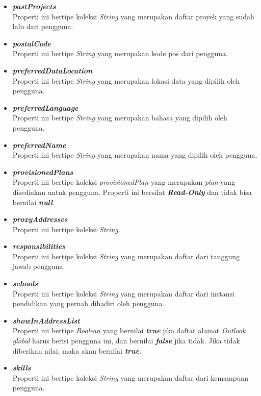 \begin{itemize}
	\item \textbf{\textit{pastProjects}}\\
	Properti ini bertipe koleksi \textit{String} yang merupakan daftar proyek yang sudah lalu dari pengguna.
	\item \textbf{\textit{postalCode}}\\
	Properti ini bertipe \textit{String} yang merupakan kode pos dari pengguna.
	\item \textbf{\textit{preferredDataLocation}}\\
	Properti ini bertipe \textit{String} yang merupakan lokasi data yang dipilih oleh pengguna.
	 \item \textbf{\textit{preferredLanguage}}\\
	Properti ini bertipe \textit{String} yang merupakan bahasa yang dipilih oleh pengguna.
	\item \textbf{\textit{preferredName}}\\
	Properti ini bertipe \textit{String} yang merupakan nama yang dipilih oleh pengguna.
	\item \textbf{\textit{provisionedPlans}}\\
	Properti ini bertipe koleksi \textit{provisionedPlan} yang merupakan \textit{plan} yang disediakan untuk pengguna. Properti ini bersifat \textbf{\textit{Read-Only}} dan tidak bisa bernilai \textbf{\textit{null}}.
	\item \textbf{\textit{proxyAddresses}}\\
	Properti ini bertipe koleksi \textit{String}.
	\item \textbf{\textit{responsibilities}}\\
	Properti ini bertipe koleksi \textit{String} yang merupakan daftar dari tanggung jawab pengguna.
	\item \textbf{\textit{schools}}\\
	Properti ini bertipe koleksi \textit{String} yang merupakan daftar dari instansi pendidikan yang pernah dihadiri oleh pengguna.
	\item \textbf{\textit{showInAddressList}}\\
	Properti ini bertipe \textit{Boolean} yang bernilai \textbf{\textit{true}} jika daftar alamat \textit{Outlook global} harus berisi pengguna ini, dan bernilai \textbf{\textit{false}} jika tidak. Jika tidak diberikan nilai, maka akan bernilai \textbf{\textit{true}}. 
	\item \textbf{\textit{skills}}\\
	Properti ini bertipe koleksi \textit{String} yang merupakan daftar dari kemampuan pengguna. 

\end{itemize}
